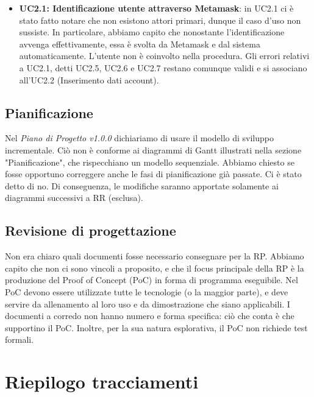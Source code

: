 \begin{itemize}
	\item \textbf{UC2.1: Identificazione utente attraverso Metamask}: in UC2.1 ci è stato fatto notare che non esistono attori primari, dunque il caso d'uso non sussiste. In particolare, abbiamo capito che nonostante l'identificazione avvenga effettivamente, essa è svolta da Metamask e dal sistema automaticamente. L'utente non è coinvolto nella procedura. Gli errori relativi a UC2.1, detti UC2.5, UC2.6 e UC2.7 restano comunque validi e si associano all'UC2.2 (Inserimento dati account).
	
\end{itemize}

\subsection{Pianificazione}
Nel \textit{Piano di Progetto v1.0.0} dichiariamo di usare il modello di sviluppo incrementale. Ciò non è conforme ai diagrammi di Gantt illustrati nella sezione "Pianificazione", che rispecchiano un modello sequenziale. Abbiamo chiesto se fosse opportuno correggere anche le fasi di pianificazione già passate. Ci è stato detto di no. Di conseguenza, le modifiche saranno apportate solamente ai diagrammi successivi a RR (esclusa).

\subsection{Revisione di progettazione}
Non era chiaro quali documenti fosse necessario consegnare per la RP. Abbiamo capito che non ci sono vincoli a proposito, e che il focus principale della RP è la produzione del Proof of Concept (PoC) in forma di programma eseguibile. Nel PoC devono essere utilizzate tutte le tecnologie (o la maggior parte), e deve servire da allenamento al loro uso e da dimostrazione che siano applicabili. I documenti a corredo non hanno numero e forma specifica: ciò che conta è che supportino il PoC.
Inoltre, per la sua natura esplorativa, il PoC non richiede test formali.


\pagebreak

\section{Riepilogo tracciamenti}

	
